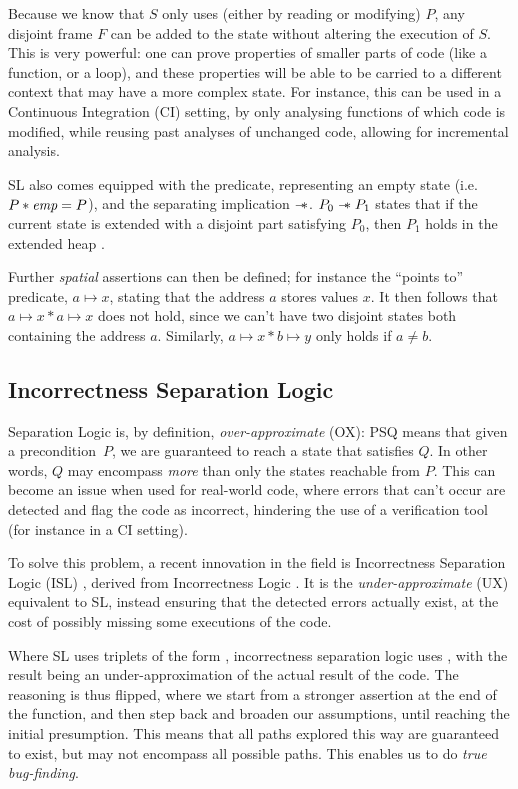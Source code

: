 Because we know that $S$ only uses (either by reading or modifying) $P$, any disjoint frame $F$ can be added to the state without altering the execution of $S$. This is very powerful: one can prove properties of smaller parts of code (like a function, or a loop), and these properties will be able to be carried to a different context that may have a more complex state. For instance, this can be used in a Continuous Integration (CI) setting, by only analysing functions of which code is modified, while reusing past analyses of unchanged code, allowing for incremental analysis.

SL also comes equipped with the \emp{} predicate, representing an empty state (i.e. ${P * \textit{emp} = P}$), and the separating implication $\mathrel{-\!\!\ast}$. $P_0 \mathrel{-\!\!\ast} P_1$ states that if the current state is extended with a disjoint part satisfying $P_0$, then $P_1$ holds in the extended heap \cite{seplogic2}.

Further \emph{spatial} assertions can then be defined; for instance the ``points to'' predicate, $a \mapsto x$, stating that the address $a$ stores values $x$. It then follows that $a \mapsto x * a \mapsto x$ does not hold, since we can't have two disjoint states both containing the address $a$. Similarly, $a\mapsto x * b \mapsto y$ only holds if $a\neq b$.

\subsection{Incorrectness Separation Logic}

Separation Logic is, by definition, \emph{over-approximate} (OX): \SLtriple PSQ means that given a precondition~$P$, we are guaranteed to reach a state that satisfies $Q$. In other words, $Q$ may encompass \emph{more} than only the states reachable from $P$. This can become an issue when used for real-world code, where errors that can't occur are detected and flag the code as incorrect, hindering the use of a verification tool (for instance in a CI setting).

To solve this problem, a recent innovation in the field is Incorrectness Separation Logic (ISL) \cite{isl}, derived from Incorrectness Logic \cite{incorrectnesslogic}. It is the \emph{under-approximate} (UX) equivalent to SL, instead ensuring that the detected errors actually exist, at the cost of possibly missing some executions of the code.

Where SL uses triplets of the form , incorrectness separation logic uses , with the result being an under-approximation of the actual result of the code. The reasoning is thus flipped, where we start from a stronger assertion at the end of the function, and then step back and broaden our assumptions, until reaching the initial presumption. This means that all paths explored this way are guaranteed to exist, but may not encompass all possible paths. This enables us to do \emph{true bug-finding}.

